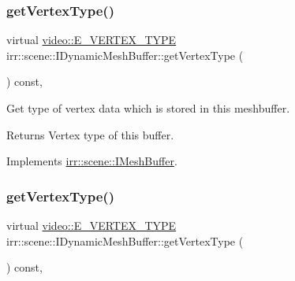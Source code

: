 \subsubsection{\texorpdfstring{get\+Vertex\+Type()}{getVertexType()}\hspace{0.1cm}{\footnotesize\ttfamily [1/2]}}
{\footnotesize\ttfamily virtual \hyperlink{namespaceirr_1_1video_a0e3b59e025e0d0db0ed2ee0ce904deac}{video\+::\+E\+\_\+\+V\+E\+R\+T\+E\+X\+\_\+\+T\+Y\+PE} irr\+::scene\+::\+I\+Dynamic\+Mesh\+Buffer\+::get\+Vertex\+Type (\begin{DoxyParamCaption}{ }\end{DoxyParamCaption}) const\hspace{0.3cm}{\ttfamily [inline]}, {\ttfamily [virtual]}}



Get type of vertex data which is stored in this meshbuffer. 

\begin{DoxyReturn}{Returns}
Vertex type of this buffer. 
\end{DoxyReturn}


Implements \hyperlink{classirr_1_1scene_1_1IMeshBuffer_a4d7a84ae4416487736f0ed0f519bb4f0}{irr\+::scene\+::\+I\+Mesh\+Buffer}.

\mbox{\label{classirr_1_1scene_1_1IDynamicMeshBuffer_a3e7523774efaf9a177de6396dfdc14e2}} 
\subsubsection{\texorpdfstring{get\+Vertex\+Type()}{getVertexType()}\hspace{0.1cm}{\footnotesize\ttfamily [2/2]}}
{\footnotesize\ttfamily virtual \hyperlink{namespaceirr_1_1video_a0e3b59e025e0d0db0ed2ee0ce904deac}{video\+::\+E\+\_\+\+V\+E\+R\+T\+E\+X\+\_\+\+T\+Y\+PE} irr\+::scene\+::\+I\+Dynamic\+Mesh\+Buffer\+::get\+Vertex\+Type (\begin{DoxyParamCaption}{ }\end{DoxyParamCaption}) const\hspace{0.3cm}{\ttfamily [inline]}, {\ttfamily [virtual]}}



